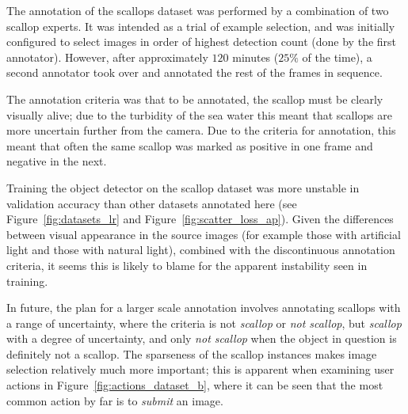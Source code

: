 The annotation of the scallops dataset was performed by a combination of two scallop experts. It was intended as a trial of example selection, and was initially configured to select images in order of highest detection count (done by the first annotator). However, after approximately $120$ minutes ($25\%$ of the time), a second annotator took over and annotated the rest of the frames in sequence. 

The annotation criteria was that to be annotated, the scallop must be clearly visually alive; due to the turbidity of the sea water this meant that scallops are more uncertain further from the camera. Due to the criteria for annotation, this meant that often the same scallop was marked as positive in one frame and negative in the next. 

Training the object detector on the scallop dataset was more unstable in validation accuracy than other datasets annotated here (see Figure~\ref{fig:datasets_lr} and Figure~\ref{fig:scatter_loss_ap}). Given the differences between visual appearance in the source images (for example those with artificial light and those with natural light), combined with the discontinuous annotation criteria, it seems this is likely to blame for the apparent instability seen in training. 

In future, the plan for a larger scale annotation involves annotating scallops with a range of uncertainty, where the criteria is not \emph{scallop} or \emph{not scallop}, but \emph{scallop} with a degree of uncertainty, and only \emph{not scallop} when the object in question is definitely not a scallop. The sparseness of the scallop instances makes image selection relatively much more important; this is apparent when examining user actions in Figure~\ref{fig:actions_dataset_b}, where it can be seen that the most common action by far is to \emph{submit} an image.

